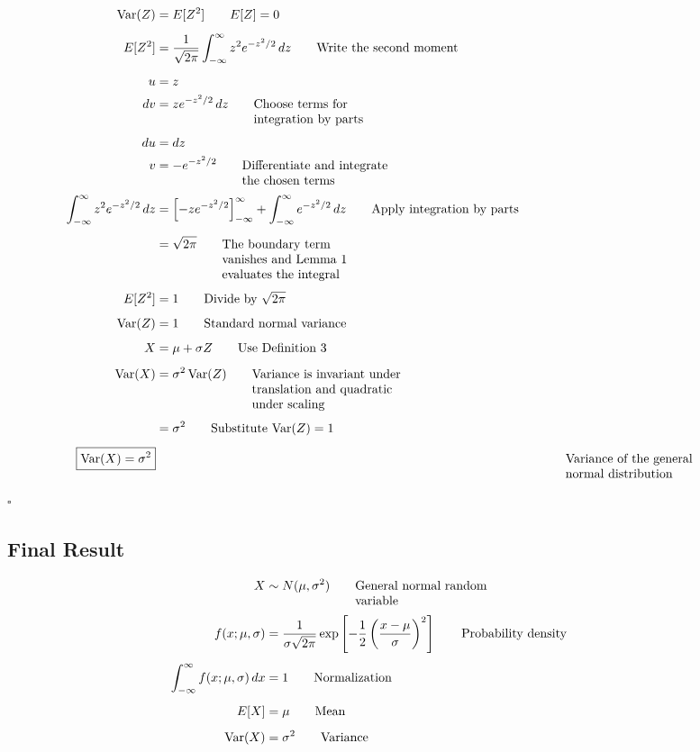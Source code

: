 \documentclass{article}
\newcommand{\justwidth}{0.36\textwidth}
\newcommand{\just}[1]{\parbox[t]{\justwidth}{\raggedright #1}}
\begin{document}
\begin{align*}
\operatorname{Var}(Z)
&=
E[Z^2]
\tag*{\just{$E[Z]=0$}}
\\[0.45em]
E[Z^2]
&=
\frac{1}{\sqrt{2\pi}}
\int_{-\infty}^{\infty}
z^2e^{-z^2/2}\,dz
\tag*{\just{Write the second moment}}
\\[0.45em]
u
&=
z
\\
dv
&=
z e^{-z^2/2}\,dz
\tag*{\just{Choose terms for integration by parts}}
\\[0.45em]
du
&=
dz
\\
v
&=
-e^{-z^2/2}
\tag*{\just{Differentiate and integrate the chosen terms}}
\\[0.45em]
\int_{-\infty}^{\infty}
z^2e^{-z^2/2}\,dz
&=
\left[
-z e^{-z^2/2}
\right]_{-\infty}^{\infty}
+
\int_{-\infty}^{\infty}
e^{-z^2/2}\,dz
\tag*{\just{Apply integration by parts}}
\\[0.45em]
&=
\sqrt{2\pi}
\tag*{\just{The boundary term vanishes and Lemma 1 evaluates the integral}}
\\[0.45em]
E[Z^2]
&=
1
\tag*{\just{Divide by $\sqrt{2\pi}$}}
\\[0.45em]
\operatorname{Var}(Z)
&=
1
\tag*{\just{Standard normal variance}}
\\[0.45em]
X
&=
\mu+\sigma Z
\tag*{\just{Use Definition 3}}
\\[0.45em]
\operatorname{Var}(X)
&=
\sigma^2
\operatorname{Var}(Z)
\tag*{\just{Variance is invariant under translation and quadratic under scaling}}
\\[0.45em]
&=
\sigma^2
\tag*{\just{Substitute $\operatorname{Var}(Z)=1$}}
\\[0.45em]
\boxed{
\operatorname{Var}(X)
=
\sigma^2
}
&&
\tag*{\just{Variance of the general normal distribution}}
\end{align*}

$\square$

\subsection{Final Result}
\begin{align*}
X
&\sim
N(\mu,\sigma^2)
\tag*{\just{General normal random variable}}
\\[0.45em]
f(x;\mu,\sigma)
&=
\frac{1}{\sigma\sqrt{2\pi}}
\exp\left[
-\frac{1}{2}
\left(
\frac{x-\mu}{\sigma}
\right)^2
\right]
\tag*{\just{Probability density}}
\\[0.45em]
\int_{-\infty}^{\infty}
f(x;\mu,\sigma)\,dx
&=
1
\tag*{\just{Normalization}}
\\[0.45em]
E[X]
&=
\mu
\tag*{\just{Mean}}
\\[0.45em]
\operatorname{Var}(X)
&=
\sigma^2
\tag*{\just{Variance}}
\end{align*}
\end{document}
